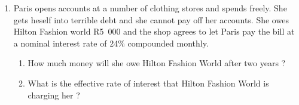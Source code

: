 \begin{enumerate}
\item{Paris opens accounts at a number of clothing stores and spends freely.  She gets heself into terrible debt and she cannot pay off her accounts.  She owes Hilton Fashion world R5~000 and the shop agrees to let Paris pay the bill at a nominal interest rate of 24\% compounded monthly.
\begin{enumerate}
\item{How much money will she owe Hilton Fashion World after two years ?}
\item{What is the effective rate of interest that Hilton Fashion World is charging her ?}
\end{enumerate}}
\end{enumerate}







